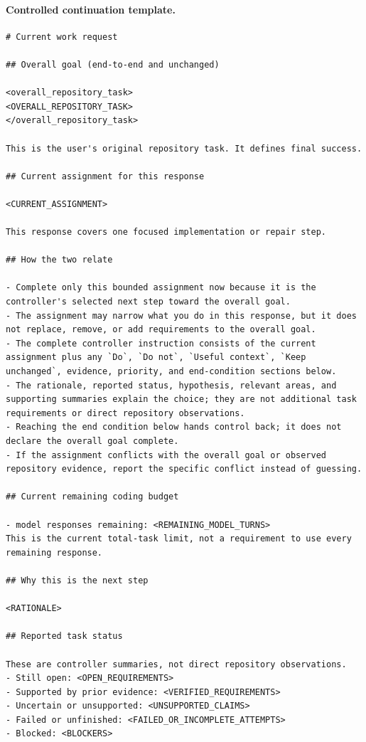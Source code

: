 \paragraph{Controlled continuation template.}
\mbox{}\par\nobreak
\begin{lstlisting}[style=looparenaprompt]
# Current work request

## Overall goal (end-to-end and unchanged)

<overall_repository_task>
<OVERALL_REPOSITORY_TASK>
</overall_repository_task>

This is the user's original repository task. It defines final success.

## Current assignment for this response

<CURRENT_ASSIGNMENT>

This response covers one focused implementation or repair step.

## How the two relate

- Complete only this bounded assignment now because it is the controller's selected next step toward the overall goal.
- The assignment may narrow what you do in this response, but it does not replace, remove, or add requirements to the overall goal.
- The complete controller instruction consists of the current assignment plus any `Do`, `Do not`, `Useful context`, `Keep unchanged`, evidence, priority, and end-condition sections below.
- The rationale, reported status, hypothesis, relevant areas, and supporting summaries explain the choice; they are not additional task requirements or direct repository observations.
- Reaching the end condition below hands control back; it does not declare the overall goal complete.
- If the assignment conflicts with the overall goal or observed repository evidence, report the specific conflict instead of guessing.

## Current remaining coding budget

- model responses remaining: <REMAINING_MODEL_TURNS>
This is the current total-task limit, not a requirement to use every remaining response.

## Why this is the next step

<RATIONALE>

## Reported task status

These are controller summaries, not direct repository observations.
- Still open: <OPEN_REQUIREMENTS>
- Supported by prior evidence: <VERIFIED_REQUIREMENTS>
- Uncertain or unsupported: <UNSUPPORTED_CLAIMS>
- Failed or unfinished: <FAILED_OR_INCOMPLETE_ATTEMPTS>
- Blocked: <BLOCKERS>


\end{lstlisting}
